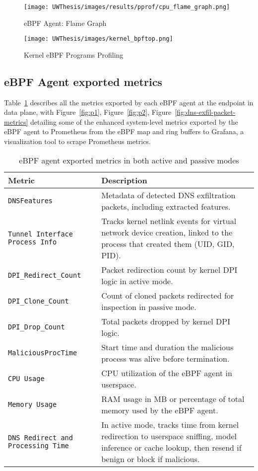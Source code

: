 \documentclass [11pt, proquest] {uwthesis}[2020/02/24]
\begin{document}
\begin{figure}[htbp]
    \centering
    \texttt{[image: UWThesis/images/results/pprof/cpu\_flame\_graph.png]}
    \caption{eBPF Agent: Flame Graph}
    \label{fig:c4}
\end{figure}

\begin{figure}[htbp]
    \centering
    \texttt{[image: UWThesis/images/kernel\_bpftop.png]}
    \caption{Kernel eBPF Programs Profiling}
    \label{fig:c3}
\end{figure}


\subsection{eBPF Agent exported metrics}
Table~\ref{sec:dp_ebpf_node_metrics} describes all the metrics exported by each eBPF agent at the endpoint in data plane, with Figure~\ref{fig:p1}, Figure~\ref{fig:p2}, Figure~\ref{fig:dns-exfil-packet-metrics} detailing some of the enhanced system-level metrics exported by the eBPF agent to Prometheus from the eBPF map and ring buffers to Grafana, a visualization tool to scrape Prometheus metrics.

\begin{longtable}{|p{4cm}|p{10cm}|}
\caption{eBPF agent exported metrics in both active and passive modes} \label{sec:dp_ebpf_node_metrics} \\
\hline
\textbf{Metric} & \textbf{Description} \\
\hline
\texttt{DNSFeatures} & Metadata of detected DNS exfiltration packets, including extracted features. \\
\hline
\texttt{Tunnel Interface Process Info} & Tracks kernel netlink events for virtual network device creation, linked to the process that created them (UID, GID, PID). \\
\hline
\texttt{DPI\_Redirect\_Count} & Packet redirection count by kernel DPI logic in active mode. \\
\hline
\texttt{DPI\_Clone\_Count} & Count of cloned packets redirected for inspection in passive mode. \\
\hline
\texttt{DPI\_Drop\_Count} & Total packets dropped by kernel DPI logic. \\
\hline
\texttt{MaliciousProcTime} & Start time and duration the malicious process was alive before termination. \\
\hline
\texttt{CPU Usage} & CPU utilization of the eBPF agent in userspace. \\
\hline
\texttt{Memory Usage} & RAM usage in MB or percentage of total memory used by the eBPF agent. \\
\hline
\texttt{DNS Redirect and Processing Time} & In active mode, tracks time from kernel redirection to userspace sniffing, model inference or cache lookup, then resend if benign or block if malicious. \\
\hline
\end{longtable}
\end{document}

